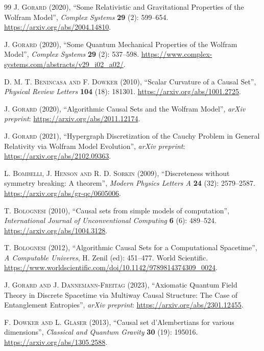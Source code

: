 \documentclass{article}
\begin{document}
\begin{thebibliography}{99}
\textsc{J. Gorard} (2020), ``Some Relativistic and Gravitational Properties of the Wolfram Model'', \textit{Complex Systems} \textbf{29} (2): 599--654. \url{https://arxiv.org/abs/2004.14810}.

\textsc{J. Gorard} (2020), ``Some Quantum Mechanical Properties of the Wolfram Model'', \textit{Complex Systems} \textbf{29} (2): 537--598. \url{https://www.complex-systems.com/abstracts/v29_i02_a02/}.

\textsc{D. M. T. Benincasa and F. Dowker} (2010), ``Scalar Curvature of a Causal Set'', \textit{Physical Review Letters} \textbf{104} (18): 181301. \url{https://arxiv.org/abs/1001.2725}.

\textsc{J. Gorard} (2020), ``Algorithmic Causal Sets and the Wolfram Model'', \textit{arXiv preprint}: \url{https://arxiv.org/abs/2011.12174}.

\textsc{J. Gorard} (2021), ``Hypergraph Discretization of the Cauchy Problem in General Relativity via Wolfram Model Evolution'', \textit{arXiv preprint}: \url{https://arxiv.org/abs/2102.09363}.

\textsc{L. Bombelli, J. Henson and R. D. Sorkin} (2009), ``Discreteness without symmetry breaking: A theorem'', \textit{Modern Physics Letters A} \textbf{24} (32): 2579--2587. \url{https://arxiv.org/abs/gr-qc/0605006}.

\textsc{T. Bolognesi} (2010), ``Causal sets from simple models of computation'', \textit{International Journal of Unconventional Computing} \textbf{6} (6): 489--524. \url{https://arxiv.org/abs/1004.3128}.

\textsc{T. Bolognesi} (2012), ``Algorithmic Causal Sets for a Computational Spacetime'', \textit{A Computable Univeres}, H. Zenil (ed): 451--477. World Scientific. \url{https://www.worldscientific.com/doi/10.1142/9789814374309_0024}.

\textsc{J. Gorard and J. Dannemann-Freitag} (2023), ``Axiomatic Quantum Field Theory in Discrete Spacetime via Multiway Causal Structure: The Case of Entanglement Entropies'', \textit{arXiv preprint}: \url{https://arxiv.org/abs/2301.12455}.

\textsc{F. Dowker and L. Glaser} (2013), ``Causal set d'Alembertians for various dimensions'', \textit{Classical and Quantum Gravity} \textbf{30} (19): 195016. \url{https://arxiv.org/abs/1305.2588}.


\end{thebibliography}
\end{document}

